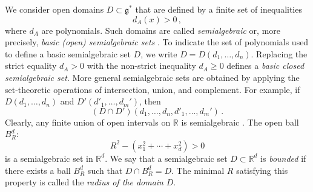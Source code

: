 \documentclass[12pt,a4paper]{article}
\numberwithin{equation}{section}
\theoremstyle{theorem}
\theoremstyle{remark}
\newcommand{\gs}{\mathfrak{g}^\ast}
\begin{document}
We consider open domains $D\subset \gs$ that are defined by a finite set of inequalities
\begin{equation}\label{obs}
    d_A(x) > 0\,,
\end{equation}
where $d_A$ are polynomials. Such domains are called {\it semialgebraic} or, more  precisely, {\it basic (open) semialgebraic sets} \cite{Berr2001PositivePO, book:92008691,scheiderer2024course,book:100944507}. To indicate the set of polynomials used to define a basic semialgebraic  set $D$, we write $D=D(d_1, \ldots, d_n)$. Replacing the strict equality $d_A>0$ with the non-strict inequality $d_A\geq 0$ defines a {\it basic closed semialgebraic set}. More general  semialgebraic sets are obtained by applying the set-theoretic operations of intersection, union, and complement. For example, if $D(d_1,\ldots, d_n)$  and $D'(d'_1,\ldots, d_m')$, then 
$$
(D\cap D')(d_1,\ldots,d_n,d'_1,\ldots,d_m')\,.
$$
Clearly, any finite union of open intervals on $\mathbb{R}$ is semialgebraic . The open ball $B^d_R$: 
$$
R^2-(x_1^2+\cdots +x_d^2)>0
$$
is a semialgebraic  set in $\mathbb{R}^d$. We say that a semialgebraic  set $D\subset \mathbb{R}^d$ is {\it bounded} if there exists a ball $B^d_R$ such that $D\cap B^d_R=D$. The minimal $R$ satisfying this property is called the {\it radius of the domain} $D$. 
\end{document}
